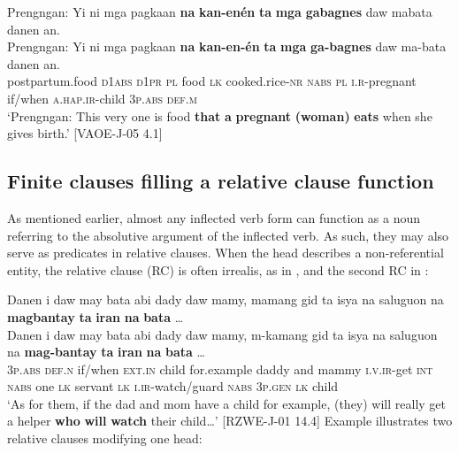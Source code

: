 \newpage
\ea
Prengngan:  Yi ni  mga  pagkaan  \textbf{na}  \textbf{kan-enén}  \textbf{ta}  \textbf{mga}   \textbf{gabagnes} daw  mabata  danen  an. \smallskip\\
\gll Prengngan:  Yi ni  mga  pagkaan  \textbf{na}  \textbf{kan-en-én}  \textbf{ta}  \textbf{mga}   \textbf{ga-bagnes} daw  ma-bata  danen  an. \\
postpartum.food\footnotemark{}  \textsc{d1abs} \textsc{d1pr}  \textsc{pl}  food  \textsc{lk}  cooked.rice-\textsc{nr}  \textsc{nabs}  \textsc{pl}  \textsc{i.r}-pregnant
if/when  \textsc{a.hap.ir}-child  3\textsc{p.abs}  \textsc{def.m} \\
\glt `Prengngan: This very one is food \textbf{that} \textbf{a} \textbf{pregnant} \textbf{(woman)} \textbf{eats} when she gives birth.’ [VAOE-J-05 4.1]
\z

\subsection{Finite clauses filling a relative clause function}
\label{bkm:Ref116818852}
As mentioned earlier, almost any inflected verb form can function as a noun referring to the absolutive argument of the inflected verb. As such, they may also serve as predicates in relative clauses. When the head describes a non-referential entity, the relative clause (RC) is often irrealis, as in , and the second RC in :

\ea
\label{bkm:Ref474746763}
Danen  i  daw  may  bata  abi  dady  daw  mamy,  mamang gid  ta  isya  na  saluguon  na  \textbf{magbantay}  \textbf{ta}  \textbf{iran}  \textbf{na}  \textbf{bata} … \smallskip\\
\gll Danen  i  daw  may  bata  abi  dady  daw  mamy,  m-kamang gid  ta  isya  na  saluguon  na  \textbf{mag-bantay}  \textbf{ta}  \textbf{iran}  \textbf{na}  \textbf{bata} … \\
3\textsc{p.abs}  \textsc{def.n}  if/when  \textsc{ext.in}  child  for.example  daddy  and  mammy  \textsc{i.v.ir}-get
\textsc{int}  \textsc{nabs}  one  \textsc{lk}  servant  \textsc{lk}  \textsc{i.ir}-watch/guard  \textsc{nabs}  3\textsc{p.gen}  \textsc{lk}  child \\
\glt `As for them, if the dad and mom have a child for example, (they) will really get a helper \textbf{who} \textbf{will} \textbf{watch} their child…’ [RZWE-J-01  14.4]
\z
Example  illustrates two relative clauses modifying one head:


